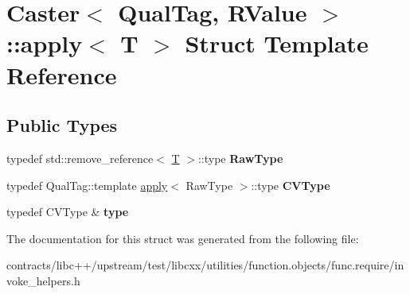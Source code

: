 \hypertarget{struct_caster_1_1apply}{}\section{Caster$<$ Qual\+Tag, R\+Value $>$\+:\+:apply$<$ T $>$ Struct Template Reference}
\label{struct_caster_1_1apply}
\subsection*{Public Types}
\begin{DoxyCompactItemize}
\item 
\mbox{\label{struct_caster_1_1apply_ac4439946c2049a15e25e11426580947b}} 
typedef std\+::remove\+\_\+reference$<$ \mbox{\hyperlink{struct_t}{T}} $>$\+::type {\bfseries Raw\+Type}
\item 
\mbox{\label{struct_caster_1_1apply_abb089e542b84c013658e771c137ede1d}} 
typedef Qual\+Tag\+::template \mbox{\hyperlink{struct_caster_1_1apply}{apply}}$<$ Raw\+Type $>$\+::type {\bfseries C\+V\+Type}
\item 
\mbox{\label{struct_caster_1_1apply_a25e91a3f3afe7139eb76aebbd067efa8}} 
typedef C\+V\+Type \& {\bfseries type}
\end{DoxyCompactItemize}


The documentation for this struct was generated from the following file\+:\begin{DoxyCompactItemize}
\item 
contracts/libc++/upstream/test/libcxx/utilities/function.\+objects/func.\+require/invoke\+\_\+helpers.\+h\end{DoxyCompactItemize}

